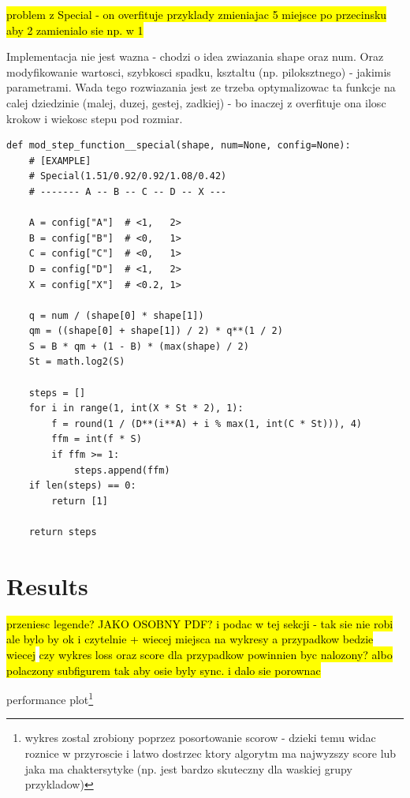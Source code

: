 \documentclass[format=acmsmall,screen,review,authordraft,nonacm]{acmart}
\begin{document}
\hl{problem z Special - on overfituje przyklady zmieniajac 5 miejsce po
przecinsku aby 2 zamienialo sie np. w 1}

Implementacja nie jest wazna - chodzi o idea zwiazania shape oraz num. Oraz
modyfikowanie wartosci, szybkosci spadku, ksztaltu (np. piloksztnego) - jakimis
parametrami. Wada tego rozwiazania jest ze trzeba optymalizowac ta funkcje na
calej dziedzinie (malej, duzej, gestej, zadkiej) - bo inaczej z overfituje ona
ilosc krokow i wiekosc stepu pod rozmiar.

\begin{lstlisting}
def mod_step_function__special(shape, num=None, config=None):
    # [EXAMPLE]
    # Special(1.51/0.92/0.92/1.08/0.42)
    # ------- A -- B -- C -- D -- X --- 

    A = config["A"]  # <1,   2>
    B = config["B"]  # <0,   1>
    C = config["C"]  # <0,   1>
    D = config["D"]  # <1,   2>
    X = config["X"]  # <0.2, 1>

    q = num / (shape[0] * shape[1])
    qm = ((shape[0] + shape[1]) / 2) * q**(1 / 2)
    S = B * qm + (1 - B) * (max(shape) / 2)
    St = math.log2(S)

    steps = []
    for i in range(1, int(X * St * 2), 1):
        f = round(1 / (D**(i**A) + i % max(1, int(C * St))), 4)
        ffm = int(f * S)
        if ffm >= 1:
            steps.append(ffm)
    if len(steps) == 0:
        return [1]

    return steps
\end{lstlisting}

\section{Results} %

\hl {przeniesc legende? JAKO OSOBNY PDF? i podac w tej sekcji - tak sie nie robi
ale bylo by ok i czytelnie + wiecej miejsca na wykresy a przypadkow bedzie
wiecej}
\hl{czy wykres loss oraz score dla przypadkow powinnien byc nalozony? albo
polaczony subfigurem tak aby osie byly sync. i dalo sie porownac}

performance plot\footnote{wykres zostal zrobiony poprzez posortowanie scorow - dzieki temu widac roznice w
przyroscie i latwo dostrzec ktory algorytm ma najwyzszy score lub jaka ma
chaktersytyke (np. jest bardzo skuteczny dla waskiej grupy przykladow)
}
\end{document}
